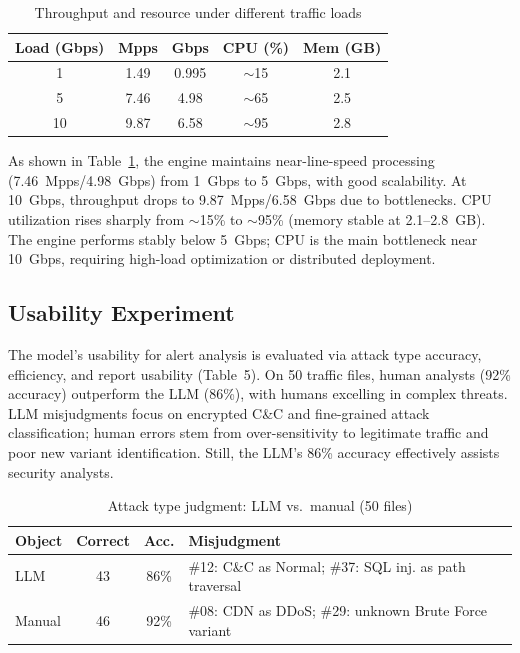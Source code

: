 \documentclass[sigconf,authordraft]{acmart}
\begin{document}
\begin{table}[htbp]
\centering
\caption{Throughput and resource under different traffic loads}
\label{tab:perf}
\small
\setlength{\tabcolsep}{4pt}
\begin{tabular}{@{}ccccc@{}}
\toprule
\textbf{Load (Gbps)} & \textbf{Mpps} & \textbf{Gbps} & \textbf{CPU (\%)} & \textbf{Mem (GB)} \\
\midrule
1 & 1.49 & 0.995 & $\sim$15 & 2.1 \\
5 & 7.46 & 4.98 & $\sim$65 & 2.5 \\
10 & 9.87 & 6.58 & $\sim$95 & 2.8 \\
\bottomrule
\end{tabular}
\end{table}

As shown in Table~\ref{tab:perf}, the engine maintains near-line-speed processing (7.46~Mpps/4.98~Gbps) from 1~Gbps to 5~Gbps, with good scalability. At 10~Gbps, throughput drops to 9.87~Mpps/6.58~Gbps due to bottlenecks. CPU utilization rises sharply from $\sim$15\% to $\sim$95\% (memory stable at 2.1--2.8~GB). The engine performs stably below 5~Gbps; CPU is the main bottleneck near 10~Gbps, requiring high-load optimization or distributed deployment.

\subsection{Usability Experiment}

The model's usability for alert analysis is evaluated via attack type accuracy, efficiency, and report usability (Table~5). On 50 traffic files, human analysts (92\% accuracy) outperform the LLM (86\%), with humans excelling in complex threats. LLM misjudgments focus on encrypted C\&C and fine-grained attack classification; human errors stem from over-sensitivity to legitimate traffic and poor new variant identification. Still, the LLM's 86\% accuracy effectively assists security analysts.

\begin{table}[htbp]
\centering
\caption{Attack type judgment: LLM vs.\ manual (50 files)}
\small
\setlength{\tabcolsep}{3pt}
\begin{tabular}{@{}p{1.5cm}c cp{3.8cm}@{}}
\toprule
\textbf{Object} & \textbf{Correct} & \textbf{Acc.} & \textbf{Misjudgment} \\
\midrule
LLM & 43 & 86\% & \#12: C\&C as Normal; \#37: SQL inj. as path traversal \\
Manual & 46 & 92\% & \#08: CDN as DDoS; \#29: unknown Brute Force variant \\
\bottomrule
\end{tabular}
\end{table}
\end{document}
